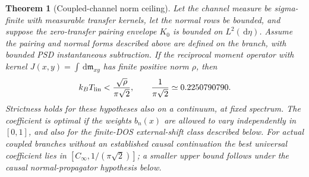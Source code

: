 \documentclass[11pt]{article}
\newtheorem{theorem}{Theorem}
\newcommand{\dd}{\,\mathrm{d}}
\newcommand{\Cinf}{C_\infty}
\newcommand{\Tlin}{T_{\rm lin}}
\begin{document}
\begin{theorem}[Coupled-channel norm ceiling]\label{thm:norm}
Let the channel measure be sigma-finite with measurable transfer kernels, let the normal rows be bounded, and suppose the zero-transfer pairing envelope $K_0$ is bounded on $L^2(\dd\eta)$. Assume the pairing and normal forms described above are defined on the branch, with bounded PSD instantaneous subtraction. If the reciprocal moment operator with kernel $J(x,y)=\int\dd\mathfrak m_{xy}$ has finite positive norm $\rho$, then
\[
 k_B\Tlin<\frac{\sqrt{\rho}}{\pi\sqrt2},
 \qquad \frac{1}{\pi\sqrt2}\simeq0.2250790790.
\]
Strictness holds for these hypotheses also on a continuum, at fixed spectrum. The coefficient is optimal if the weights $b_n(x)$ are allowed to vary independently in $[0,1]$, and also for the finite-DOS external-shift class described below. For actual coupled branches without an established causal continuation the best universal coefficient lies in $[\Cinf,1/(\pi\sqrt2)]$; a smaller upper bound follows under the causal normal-propagator hypothesis below.
\end{theorem}
\end{document}
